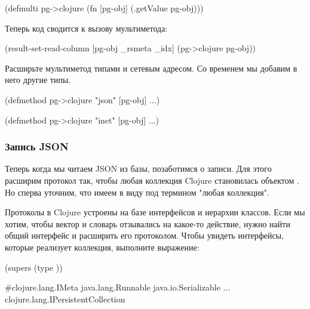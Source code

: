 \begin{english}
  \begin{clojure}
(defmulti pg->clojure (fn [pg-obj]
                        (.getValue pg-obj)))
  \end{clojure}
\end{english}

Теперь код  сводится к вызову мультиметода:

\begin{english}
  \begin{clojure}
(result-set-read-column [pg-obj _rsmeta _idx]
  (pg->clojure pg-obj))
  \end{clojure}
\end{english}

Расширьте мультиметод типами  и сетевым адресом. Со временем мы добавим в него другие типы.

\begin{english}
  \begin{clojure}
(defmethod pg->clojure "json"
  [pg-obj] ...)

(defmethod pg->clojure "inet"
  [pg-obj] ...)
  \end{clojure}
\end{english}

\subsubsection{Запись JSON}

Теперь когда мы читаем JSON из базы, позаботимся о записи. Для этого расширим протокол  так, чтобы любая коллекция Clojure становилась объектом . Но сперва уточним, что имеем в виду под термином "любая коллекция".

Протоколы в Clojure устроены на базе интерфейсов и иерархии классов. Если мы хотим, чтобы вектор и словарь отзывались на какое-то действие, нужно найти общий интерфейс и расширить его протоколом. Чтобы увидеть интерфейсы, которые реализует коллекция, выполните выражение:

\begin{english}
  \begin{clojure}
(supers (type {}))

#{clojure.lang.IMeta
  java.lang.Runnable
  java.io.Serializable
  ...
  clojure.lang.IPersistentCollection}
  \end{clojure}
\end{english}

